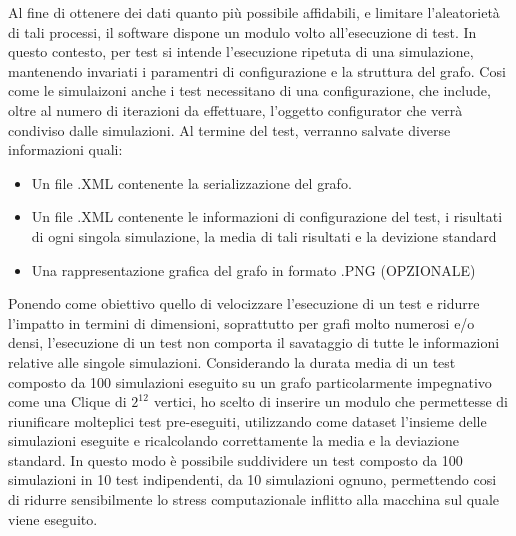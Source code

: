 \documentclass{article}
\begin{document}
Al fine di ottenere dei dati quanto più possibile affidabili, e limitare l'aleatorietà di tali processi, il software dispone un modulo volto all'esecuzione di test. In questo contesto, per test si intende l'esecuzione ripetuta di una simulazione, mantenendo invariati i paramentri di configurazione e la struttura del grafo. Cosi come le simulaizoni anche i test necessitano di una configurazione, che include, oltre al numero di iterazioni da effettuare, l'oggetto configurator che verrà condiviso dalle simulazioni.\newline
Al termine del test, verranno salvate diverse informazioni quali:
\begin{itemize}
\item Un file .XML contenente la serializzazione del grafo.
\item Un file .XML contenente le informazioni di configurazione del test, i risultati di ogni singola             simulazione, la media di tali risultati e la devizione standard
\item Una rappresentazione grafica del grafo in formato .PNG (OPZIONALE)
\end{itemize}
\newline
Ponendo come obiettivo quello di velocizzare l'esecuzione di un test e ridurre l'impatto in termini di dimensioni, soprattutto per grafi molto numerosi e/o densi, l'esecuzione di un test non comporta il savataggio di tutte le informazioni relative alle singole simulazioni.
Considerando la durata media di un test composto da 100 simulazioni eseguito su un grafo particolarmente  impegnativo come una Clique di $2^{12^{\mathrm{}}}$ vertici, ho scelto di inserire un modulo che permettesse di riunificare molteplici test pre-eseguiti, utilizzando come dataset l'insieme delle simulazioni eseguite e ricalcolando correttamente la media e la deviazione standard. \newline
In questo modo è possibile suddividere un test composto da 100 simulazioni in 10 test indipendenti, da 10 simulazioni ognuno, permettendo cosi di ridurre sensibilmente lo stress computazionale inflitto alla macchina sul quale viene eseguito.
\end{document}

